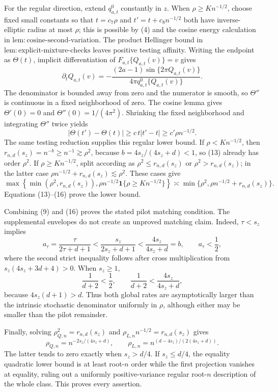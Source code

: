 For the regular direction, extend \(q_{a,t}^{0}\) constantly in \(z\). When \(\rho\ge K n^{-1/2}\), choose fixed small constants so that \(t=c_7\rho\) and \(t'=t+c_8n^{-1/2}\) both have inverse-elliptic radius at most \(\rho\); this is possible by (4) and the cosine energy calculation in \(\mathrm{lem{:}cosine\text{-}second\text{-}variation}\). The product Hellinger bound in \(\mathrm{lem{:}explicit\text{-}mixture\text{-}checks}\) leaves positive testing affinity. Writing the endpoint as \(\Theta(t)\), implicit differentiation of \(F_{a,t}\{Q_{a,t}(v)\}=v\) gives
\[
\partial_tQ_{a,t}(v)
=-\frac{(2a-1)\sin\{2\pi Q_{a,t}(v)\}}
{4\pi q_{a,t}^{0}\{Q_{a,t}(v)\}}.                                \tag{14}
\]
The denominator is bounded away from zero and the numerator is smooth, so \(\Theta''\) is continuous in a fixed neighborhood of zero. The cosine lemma gives \(\Theta'(0)=0\) and \(\Theta''(0)=1/(4\pi^2)\). Shrinking the fixed neighborhood and integrating \(\Theta''\) twice yields
\[
|\Theta(t')-\Theta(t)|\ge c\,t|t'-t|\ge c'\rho n^{-1/2}.          \tag{15}
\]
The same testing reduction supplies this regular lower bound. If \(\rho<K n^{-1/2}\), then \(r_{n,d}(s_z)=n^{-b}\ge n^{-1}\gtrsim\rho^2\), because \(b=4s_z/(4s_z+d)<1\), so (13) already has order \(\rho^2\). If \(\rho\ge K n^{-1/2}\), split according as \(\rho^2\le r_{n,d}(s_z)\) or \(\rho^2>r_{n,d}(s_z)\); in the latter case \(\rho n^{-1/2}+r_{n,d}(s_z)\lesssim\rho^2\). These cases give
\[
\max\!\left\{\min(\rho^2,r_{n,d}(s_z)),\rho n^{-1/2}\mathbf1\{\rho\ge K n^{-1/2}\}\right\}
\asymp\min\{\rho^2,\rho n^{-1/2}+r_{n,d}(s_z)\}.                 \tag{16}
\]
Equations (13)--(16) prove the lower bound.

Combining (9) and (16) proves the stated pilot matching condition. The supplemental envelopes do not create an unproved matching claim. Indeed, \(\tau<s_z\) implies
\[
a_\tau=\frac{\tau}{2\tau+d+1}
<\frac{s_z}{2s_z+d+1}
<\frac{4s_z}{4s_z+d}=b,
\qquad a_\tau<\frac12,                                             \tag{17}
\]
where the second strict inequality follows after cross multiplication from \(s_z(4s_z+3d+4)>0\). When \(s_z\ge1\),
\[
\frac1{d+2}<\frac12,
\qquad
\frac1{d+2}<\frac{4s_z}{4s_z+d},                                  \tag{18}
\]
because \(4s_z(d+1)>d\). Thus both global rates are asymptotically larger than the intrinsic stochastic denominator uniformly in \(\rho\), although either may be smaller than the pilot remainder.

Finally, solving \(\rho_{Q,n}^2=r_{n,d}(s_z)\) and \(\rho_{L,n}n^{-1/2}=r_{n,d}(s_z)\) gives
\[
\rho_{Q,n}=n^{-2s_z/(4s_z+d)},
\qquad
\rho_{L,n}=n^{(d-4s_z)/(2(4s_z+d))}.                               \tag{19}
\]
The latter tends to zero exactly when \(s_z>d/4\). If \(s_z\le d/4\), the equality quadratic lower bound is at least root-\(n\) order while the first projection vanishes at equality, ruling out a uniformly positive-variance regular root-\(n\) description of the whole class. This proves every assertion.